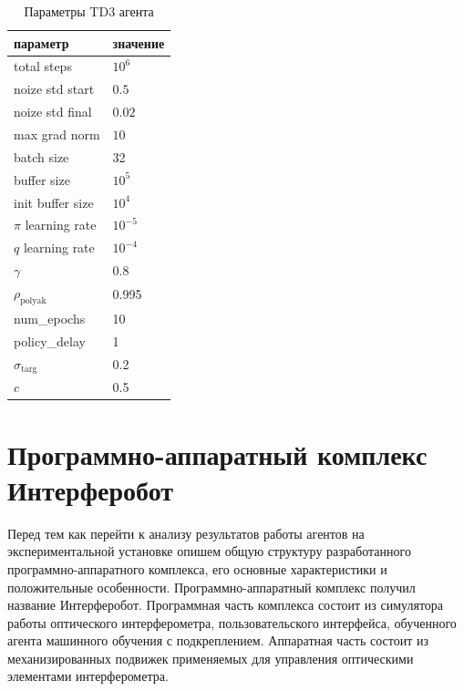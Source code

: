 \begin{table} [htbp]
    \centering
    \begin{threeparttable}%
        \caption{Параметры TD3 агента}\label{tab:td3_params}%
        \begin{tabular}{| p{5cm} || p{5cm} |}
            \hline
            \hline
            параметр & значение \\
            \hline
            total steps & $10^6$ \\
            noize std start & $0.5$ \\
            noize std final & $0.02$ \\
            max grad norm & $10$ \\
            batch size & 32 \\
            buffer size & $10^5$ \\
            init buffer size & $10^4$ \\
            $\pi$ learning rate & $10^{-5}$ \\
            $q$ learning rate & $10^{-4}$ \\
            $\gamma$ & 0.8 \\
            $\rho_{\mathrm{polyak}}$ & 0.995 \\
            num\_epochs & 10  \\
            policy\_delay & 1 \\
            $\sigma_{\mathrm{targ}}$ & 0.2 \\
            $c$ & 0.5 \\
            \hline
            \hline
        \end{tabular}
    \end{threeparttable}
\end{table}

        

\section{Программно-аппаратный комплекс Интерферобот}

Перед тем как перейти к анализу результатов работы агентов на экспериментальной установке опишем общую структуру разработанного программно-аппаратного комплекса, его основные характеристики и положительные особенности. Программно-аппаратный комплекс получил название Интерферобот. Программная часть комплекса состоит из симулятора работы оптического интерферометра, пользовательского интерфейса, обученного агента машинного обучения с подкреплением. Аппаратная часть состоит из механизированных подвижек применяемых для управления оптическими элементами интерферометра. 

